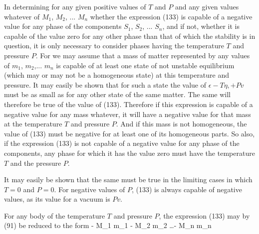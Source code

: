 \documentclass[12pt]{article}
\begin{document}
In determining for any given positive values of $T$ and $P$ and any given values whatever of $M_1$, $M_2$, ... $M_n$ whether the expression (133) is capable of a negative value for any phase of the components $S_1$, $S_2$, ... $S_n$, and if not, whether it is capable of the value zero for any other phase than that of which the stability is in question, it is only necessary to consider phases having the temperature $T$ and pressure $P$. For we may assume that a mass of matter represented by any values of $m_1$, $m_2$,... $m_n$ is capable of at least one state of not unstable equilibrium (which may or may not be a homogeneous state) at this temperature and pressure. It may easily be shown that for such a state the value of $\epsilon-T\eta, + Pv$ must be as small as for any other state of the same matter. The same will therefore be true of the value of (133). Therefore if this expression is capable of a negative value for any mass whatever, it will have a negative value for that mass at the temperature $T$ and pressure $P$. And if this mass is not homogeneous, the value of (133) must be negative for at least one of its homogeneous parts. So also, if the expression (133) is not capable of a negative value for any phase of the components, any phase for which it has the value zero must have the temperature $T$ and the pressure $P$.


It may easily be shown that the same must be true in the limiting cases in which $T =0$ and $P =0$. For negative values of $P$, (133) is always capable of negative values, as its value for a vacuum is $Pv$.


For any body of the temperature $T$ and pressure $P$, the expression
(133) may by (91) be reduced to the form
\eqs \xi - M_1 m_1 - M_2 m_2 \dots - M_n m_n \label{135}\eqe
\end{document}
